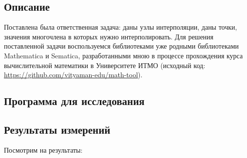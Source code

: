 \documentclass{article}
\begin{document}
\subsection{Описание}

Поставлена была ответственная задача: даны узлы интерполяции,
даны точки, значения многочлена в которых нужно интерполировать.
Для решения поставленной задачи воспользуемся библиотеками
уже родными библиотеками Mathematica и Sematica, разработанными
мною в процессе прохождения курса вычислительной математики в
Университете ИТМО (исходный код: \url{https://github.com/vityaman-edu/math-tool}).

\subsection{Программа для исследования}



\subsection{Результаты измерений}

Посмотрим на результаты:
\end{document}
